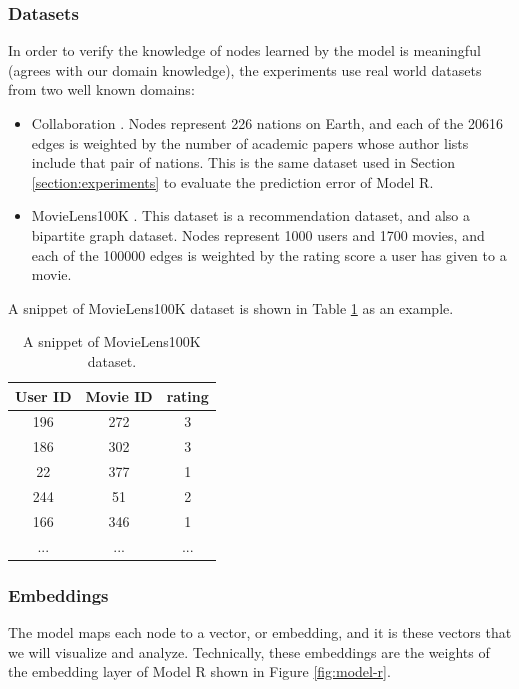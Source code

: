 \documentclass[12pt]{WSUThesis}
\theoremstyle{definition}
\begin{document}
\subsubsection{Datasets}
In order to verify the knowledge of nodes learned by the model is meaningful (agrees with our domain knowledge), the experiments use real world datasets from two well known domains:
\begin{itemize}
	\item Collaboration \cite{pan2012world}.	
	Nodes represent 226 nations on Earth, and each of the 20616 edges is weighted by the number of academic papers whose author lists include that pair of nations.
	This is the same dataset used in Section \ref{section:experiments} to evaluate the prediction error of Model R.
	\item MovieLens100K \cite{harper2015movielens}.
	This dataset is a recommendation dataset, and also a bipartite graph dataset.
	Nodes represent 1000 users and 1700 movies, and each of the 100000 edges is weighted by the rating score a user has given to a movie.
\end{itemize}
A snippet of MovieLens100K dataset is shown in Table \ref{tab:movielens100k} as an example.
\begin{table}[!ht]
	\centering
	\caption{A snippet of MovieLens100K dataset.}
	\begin{tabular}{ccc}  \hline \rowcolor{blue!30}
		User ID & Movie ID & rating \\ \hline
		196 & 272 & 3 \\ \hline
		186 & 302 & 3 \\ \hline
		22 & 377 & 1 \\ \hline
		244 & 51 & 2 \\ \hline
		166 & 346 & 1 \\ \hline
		... & ... & ... \\ \hline
	\end{tabular}
	\label{tab:movielens100k}
\end{table}

\subsubsection{Embeddings}
The model maps each node to a vector, or embedding, and it is these vectors that we will visualize and analyze.
Technically, these embeddings are the weights of the embedding layer of Model R shown in Figure \ref{fig:model-r}.
\end{document}
